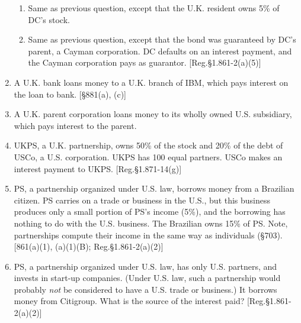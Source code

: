 \begin{select}
\begin{enumerate}
\begin{enumerate}
				\item Same as previous question, except that the U.K. resident owns 5\% of DC's stock.
				\item Same as previous question, except that the bond was guaranteed by DC's parent, a Cayman corporation.  DC defaults on an interest payment, and the Cayman corporation pays as guarantor. [Reg.\@\@ \S 1.861-2(a)(5)]
			\end{enumerate}  		
			
			\item A U.K. bank loans money to a U.K. branch of IBM, which pays interest on the loan to bank. [\S 881(a), (c)]
			
			\item A U.K. parent corporation loans money to its wholly owned U.S. subsidiary, which pays interest to the parent.
			
			\item UKPS, a U.K. partnership, owns 50\% of the stock and 20\% of the debt of USCo, a U.S. corporation.  UKPS has 100 equal partners.  USCo makes an interest payment to UKPS. [Reg.\@ \S 1.871-14(g)]
			
			\item PS, a partnership organized under U.S. law, borrows money from a Brazilian citizen.  PS carries on a trade or business in the U.S., but this business produces only a small portion of PS's income (5\%), and the borrowing has nothing to do with the U.S. business.  The Brazilian owns 15\% of PS. Note, partnerships compute their income in the same way as individuals (\S 703).  [861(a)(1), (a)(1)(B); Reg.\@ \S1.861-2(a)(2)] 
			
			\item  PS, a partnership organized under U.S. law, has only U.S. partners, and invests in start-up companies.  (Under U.S. law, such a partnership would probably \emph{not} be considered to have a U.S. trade or business.)  It borrows money from Citigroup. What is the source of the interest paid?  [Reg.\@ \S 1.861-2(a)(2)]
			

\end{enumerate}
\end{select}
